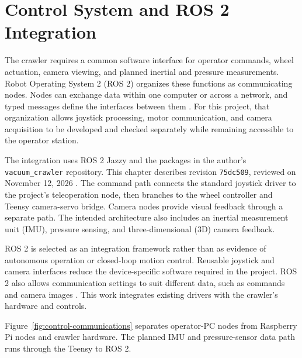 \chapter{Control System and ROS 2 Integration}
\label{chap:controls}

\label{sec:control-architecture}
The crawler requires a common software interface for operator commands, wheel actuation, camera viewing, and planned inertial and pressure measurements. Robot Operating System 2 (ROS 2) organizes these functions as communicating nodes. Nodes can exchange data within one computer or across a network, and typed messages define the interfaces between them \citep{ros2JazzyNodes,ros2JazzyInterfaces}. For this project, that organization allows joystick processing, motor communication, and camera acquisition to be developed and checked separately while remaining accessible to the operator station.

The integration uses ROS 2 Jazzy and the packages in the author's \texttt{vacuum\_crawler} repository. This chapter describes revision \texttt{75dc509}, reviewed on November 12, 2026 \citep{hernandezVacuumCrawler2026}. The command path connects the standard joystick driver to the project's teleoperation node, then branches to the wheel controller and Teensy camera-servo bridge. Camera nodes provide visual feedback through a separate path. The intended architecture also includes an inertial measurement unit (IMU), pressure sensing, and three-dimensional (3D) camera feedback. 

ROS 2 is selected as an integration framework rather than as evidence of autonomous operation or closed-loop motion control. Reusable joystick and camera interfaces reduce the device-specific software required in the project. ROS 2 also allows communication settings to suit different data, such as commands and camera images \citep{ros2JazzyQoS}. This work integrates existing drivers with the crawler's hardware and controls.

Figure~\ref{fig:control-communications} separates operator-PC nodes from Raspberry Pi nodes and crawler hardware. The planned IMU and pressure-sensor data path runs through the Teensy to ROS 2.

